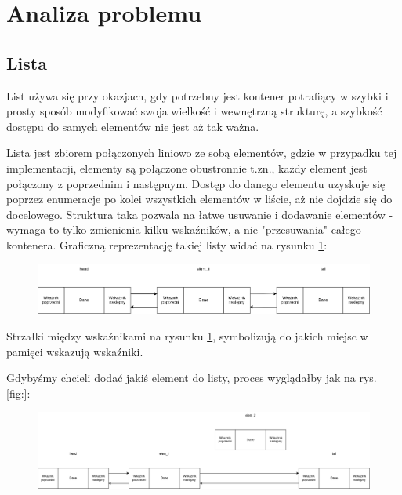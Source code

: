 \newpage
\section{Analiza problemu}		%

\subsection{Lista}

List używa się przy okazjach, gdy potrzebny jest kontener potrafiący w szybki i prosty sposób modyfikować swoja wielkość i wewnętrzną strukturę, a szybkość dostępu do samych elementów nie jest aż tak ważna.

Lista jest zbiorem połączonych liniowo ze sobą elementów\cite{llistwiki}, gdzie w przypadku tej implementacji, elementy są połączone obustronnie t.zn., każdy element jest połączony z poprzednim i następnym. Dostęp do danego elementu uzyskuje się poprzez enumeracje po kolei wszystkich elementów w liście, aż nie dojdzie się do docelowego. Struktura taka pozwala na łatwe usuwanie i dodawanie elementów - wymaga to tylko zmienienia kilku wskaźników, a nie "przesuwania" całego kontenera. Graficzną reprezentację takiej listy widać na rysunku \ref{fig:list_struct}:

\begin{figure}[H]
	\centering
	\includegraphics[width=1\textwidth]{images/lista.drawio.png}
	\caption{}
	\label{fig:list_struct}
\end{figure}

Strzałki między wskaźnikami na rysunku \ref{fig:list_struct}, symbolizują do jakich miejsc w pamięci wskazują wskaźniki.

Gdybyśmy chcieli dodać jakiś element do listy, proces wyglądałby jak na rys. \ref{fig:}:

\begin{figure}[H]
	\centering
	\includegraphics[width=1\textwidth]{images/listadodanie_pre.drawio.png}
	\caption{}
	\label{fig:list_add_pre}
\end{figure}

